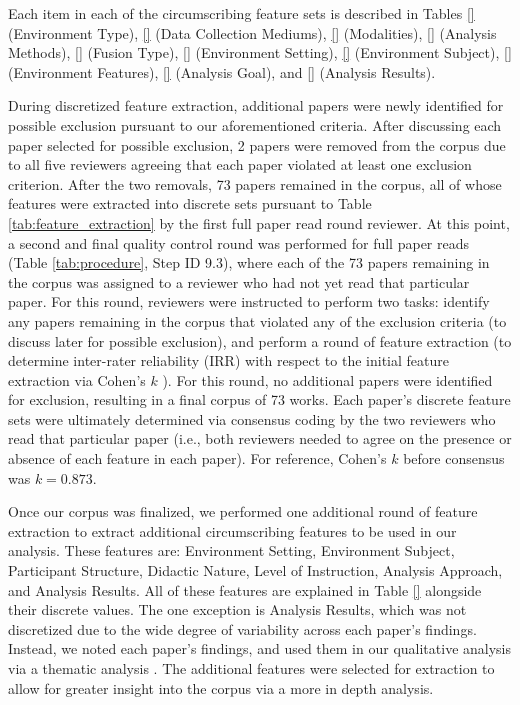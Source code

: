 \documentclass[manuscript,screen,review]{acmart}
\begin{document}
Each item in each of the circumscribing feature sets is described in Tables \ref{} (Environment Type), \ref{} (Data Collection Mediums), \ref{} (Modalities), \ref{} (Analysis Methods), \ref{} (Fusion Type), \ref{} (Environment Setting), \ref{} (Environment Subject), \ref{} (Environment Features), \ref{} (Analysis Goal), and \ref{} (Analysis Results).

During discretized feature extraction, additional papers were newly identified for possible exclusion pursuant to our aforementioned criteria. After discussing each paper selected for possible exclusion, 2 papers were removed from the corpus due to all five reviewers agreeing that each paper violated at least one exclusion criterion. After the two removals, 73 papers remained in the corpus, all of whose features were extracted into discrete sets pursuant to Table \ref{tab:feature_extraction} by the first full paper read round reviewer. At this point, a second and final quality control round was performed for full paper reads (Table \ref{tab:procedure}, Step ID 9.3), where each of the 73 papers remaining in the corpus was assigned to a reviewer who had not yet read that particular paper. For this round, reviewers were instructed to perform two tasks: identify any papers remaining in the corpus that violated any of the exclusion criteria (to discuss later for possible exclusion), and perform a round of feature extraction (to determine inter-rater reliability (IRR) with respect to the initial feature extraction via Cohen's $k$ \cite{cohen1960coefficient}). For this round, no additional papers were identified for exclusion, resulting in a final corpus of 73 works. Each paper's discrete feature sets were ultimately determined via consensus coding \cite{} by the two reviewers who read that particular paper (i.e., both reviewers needed to agree on the presence or absence of each feature in each paper). For reference, Cohen's $k$ before consensus was $k=0.873$.  

Once our corpus was finalized, we performed one additional round of feature extraction to extract additional circumscribing features to be used in our analysis. These features are: Environment Setting, Environment Subject, Participant Structure, Didactic Nature, Level of Instruction, Analysis Approach, and Analysis Results. All of these features are explained in Table \ref{} alongside their discrete values. The one exception is Analysis Results, which was not discretized due to the wide degree of variability across each paper's findings. Instead, we noted each paper's findings, and used them in our qualitative analysis via a thematic analysis \cite{}. The additional features were selected for extraction to allow for greater insight into the corpus via a more in depth analysis.
\end{document}
